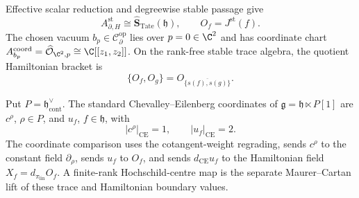 \documentclass[11pt]{memoir}
\begin{document}
Effective scalar reduction and degreewise stable passage give
\[
  A_{\partial,H}^{\mathrm{st}}
  \cong\widehat{\mathbf S}_{\mathrm{Tate}}(\mathfrak h),
  \qquad O_f=J^{\mathrm{st}}(f).
\]
The chosen vacuum
\(b_p\in\mathcal C^{\mathrm{op}}_\partial\) lies over
\(p=0\in\C^2\) and has coordinate chart
\(A^{\mathrm{coord}}_{b_p}=\widehat{\mathcal O}_{\C^2,p}\cong
\C[[z_1,z_2]]\).  On the rank-free stable trace algebra, the quotient
Hamiltonian bracket is
\[
  \{O_f,O_g\}=O_{\overline{\{s(f),s(g)\}}}.
\]

Put \(P=\mathfrak h^\vee_{\mathrm{cont}}\).  The standard
Chevalley--Eilenberg coordinates of
\(\mathfrak g=\mathfrak h\ltimes P[1]\) are
\(c^\rho\), \(\rho\in P\), and \(u_f\), \(f\in\mathfrak h\), with
\[
  |c^\rho|_{\mathrm{CE}}=1,
  \qquad |u_f|_{\mathrm{CE}}=2.
\]
The coordinate comparison uses the cotangent-weight regrading, sends
\(c^\rho\) to the constant field \(\partial_\rho\), sends \(u_f\) to
\(O_f\), and sends \(d_{\mathrm{CE}}u_f\) to the Hamiltonian field
\(X_f=d_{\pi_{\mathrm{lin}}}O_f\).  A finite-rank Hochschild-centre map
is the separate Maurer--Cartan lift of these trace and Hamiltonian
boundary values.
\end{document}
